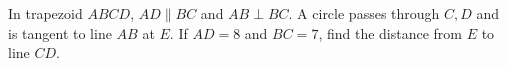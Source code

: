 In trapezoid $ABCD$, $AD\parallel BC$ and $AB\perp BC$. A circle passes through $C,D$ and is tangent to line $AB$ at $E$. If $AD=8$ and $BC=7$, find the distance from $E$ to line $CD$.
